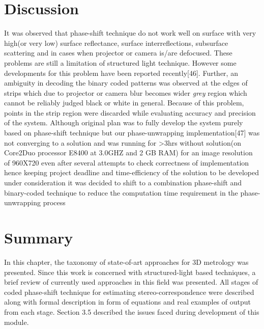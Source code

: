 \section{Discussion}
It was observed that phase-shift technique do not work well on surface with very high(or very low) surface reflectance, surface interreflections, subsurface scattering and in cases when projector or camera is/are defocused. These problems are still a limitation of structured light technique. However some developments for this problem have been reported recently[46].\newline
\indent Further, an ambiguity in decoding the binary coded patterns was observed at the edges of strips which due to projector or camera blur becomes wider \textit{grey} region which cannot be reliably judged black or white in general. Because of this problem, points in the strip region were discarded while evaluating accuracy and precision of the system.\newline
\indent Although original plan was to fully develop the system purely based on phase-shift technique but our phase-unwrapping implementation[47] was not converging to a solution and was running for >3hrs without solution(on Core2Duo processor E8400 at 3.0GHZ and 2 GB RAM) for an image resolution of 960X720 even after several attempts to check correctness of implementation hence keeping project deadline and time-efficiency of the solution to be developed under consideration it was decided to shift to a combination phase-shift and binary-coded technique to reduce the computation time requirement in the phase-unwrapping process


\section{Summary}
In this chapter, the taxonomy of state-of-art approaches for 3D metrology was presented. Since this work is concerned with structured-light based techniques, a brief review of currently used approaches in this field was presented. All stages of coded phase-shift technique for estimating stereo-correspondence were described along with formal description in form of equations and real examples of output from each stage. Section 3.5 described the issues faced during development of this module. 
